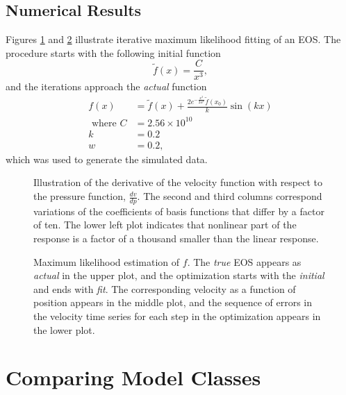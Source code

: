 \documentclass[11pt]{article}
\newcommand{\fnom}{\tilde f}
\begin{document}
\subsection{Numerical Results}
\label{sec:numerical-results}

\newcommand{\freq}{k} %
Figures \ref{fig:d} and \ref{fig:fve} illustrate iterative maximum
likelihood fitting of an EOS.  The procedure starts with the following
initial function
\begin{equation}
  \label{eq:initial}
  \fnom(x) = \frac{C}{x^3},
\end{equation}
and the iterations approach the \emph{actual} function
\begin{align}
  \label{eq:actual}
  f(x) &= \fnom(x) + \frac{2 e^{-\frac{x^2}{2w^2}}
         \fnom(x_0)}{\freq}  \sin(\freq x)\\
   \text{ where }C &= 2.56\times 10^{10} \nonumber \\
  \freq &= 0.2 \nonumber \\
  w &= 0.2, \nonumber
\end{align}
which was used to generate the simulated data.
\begin{figure}
  \centering
    \caption{Illustration of the derivative of the velocity function
      with respect to the pressure function, $\frac{d v}{d p}$.  The
      second and third columns correspond variations of the
      coefficients of basis functions that differ by a factor of ten.
      The lower left plot indicates that nonlinear part of the
      response is a factor of a thousand smaller than the linear
      response.  }
  \label{fig:d}
\end{figure}
\begin{figure}
  \centering
    \caption{Maximum likelihood estimation of $f$.  The \emph{true}
      EOS appears as \emph{actual} in the upper plot, and the
      optimization starts with the \emph{initial} and ends with
      \emph{fit}.  The corresponding velocity as a function of
      position appears in the middle plot, and the sequence of errors
      in the velocity time series for each step in the optimization
      appears in the lower plot. }
  \label{fig:fve}
\end{figure}

\section{Comparing Model Classes}
\label{sec:classes}
\end{document}
